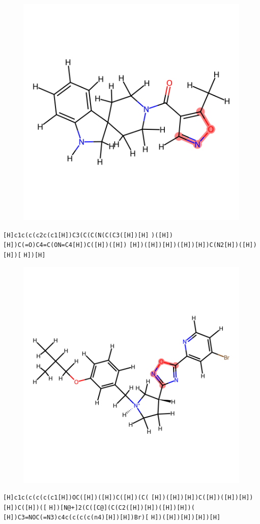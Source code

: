 \documentclass{article}
\begin{document}
\begin{figure}[ht]
\centering
    \includegraphics{mol68.png}
\end{figure}
\verb|[H]c1c(c(c2c(c1[H])C3(C(C(N(C(C3([H])[H]| \verb|)([H])[H])C(=O)C4=C(ON=C4[H])C([H])([H])| \verb|[H])([H])[H])([H])[H])C(N2[H])([H])[H])[| \verb|H])[H]|

\begin{figure}[ht]
\centering
    \includegraphics{mol69.png}
\end{figure}
\verb|[H]c1c(c(c(c(c1[H])OC([H])([H])C([H])(C(| \verb|[H])([H])[H])C([H])([H])[H])[H])C([H])([| \verb|H])[N@+]2(C([C@](C(C2([H])[H])([H])[H])(| \verb|[H])C3=NOC(=N3)c4c(c(c(c(n4)[H])[H])Br)[| \verb|H])([H])[H])[H])[H]|
\end{document}
